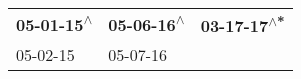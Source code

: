 \begin{supertabular}{lll}
 \textbf{05-01-15\textsuperscript{$\wedge$}} &  \textbf{05-06-16\textsuperscript{$\wedge$}} &  \textbf{03-17-17\textsuperscript{$\wedge$*}} \\
                  05-02-15\textsuperscript{} &                   05-07-16\textsuperscript{} &                                               \\
\end{supertabular}

